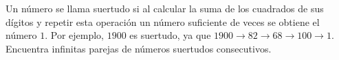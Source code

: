 Un número se llama suertudo si al calcular la suma de los cuadrados de sus dígitos y repetir esta operación un número suficiente de veces se obtiene el número $1$. Por ejemplo, $1900$ es suertudo, ya que $1900 \to 82 \to 68 \to 100 \to 1$. Encuentra infinitas parejas de números suertudos consecutivos.